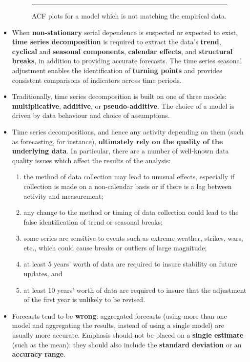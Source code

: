 \begin{itemize}[noitemsep]
\begin{figure}[t]
\caption{ACF plots for a model which is not matching the empirical data.}\hrule
\label{fig:ACF}
\end{figure}
\item When \textbf{non-stationary} serial dependence is suspected or expected to exist, \textbf{time series decomposition} is required to extract the data's \textbf{trend}, \textbf{cyclical}  and \textbf{seasonal components}, \textbf{calendar effects}, and \textbf{structural breaks}, in addition to providing accurate forecasts. The time series seasonal adjustment enables the identification of \textbf{turning points} and provides consistent comparisons of indicators across time periods.
\item Traditionally, time series decomposition is built on one of three models: \textbf{multiplicative}, \textbf{additive}, or \textbf{pseudo-additive}. The choice of a model is driven by data behaviour and choice of assumptions.
\item Time series decompositions, and hence any activity depending on them (such as forecasting, for instance), \textbf{ultimately rely on the quality of the underlying data}. In particular, there are a number of well-known data quality issues which affect the results of the analysis: 
\begin{enumerate}
\item the method of data collection may lead to unusual effects, especially if collection is made on a non-calendar basis or if there is a lag between activity and measurement;
\item any change to the method or timing of data collection could lead to the false identification of trend or seasonal breaks;
\item some series are sensitive to events such as extreme weather, strikes, wars, etc., which could cause breaks or outliers of large magnitude;
\item at least 5 years' worth of data are required to insure stability on future updates, and
\item at least 10 years' worth of data are required to insure that the adjustment of the first year is unlikely to be revised.    
\end{enumerate}
\item Forecasts tend to be \textbf{wrong}: aggregated forecasts (using more than one model and aggregating the results, instead of using a single model) are usually more accurate. Emphasis should not be placed on a \textbf{single estimate} (such as the mean): they should also include the \textbf{standard deviation} or an \textbf{accuracy range}.  

\end{itemize}
